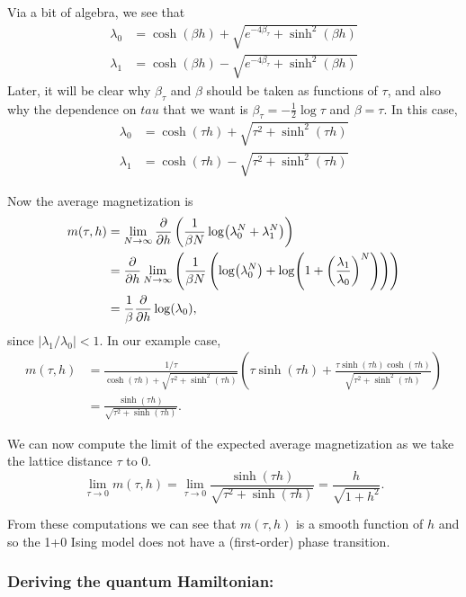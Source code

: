 \documentclass[10pt,reqno]{amsart}
\begin{document}
	Via a bit of algebra, we see that 
	\begin{align*}
		\lambda_0 &=\cosh(\beta h)+ \sqrt{e^{-4\beta_\tau} +\sinh^2(\beta h) } \\
		\lambda_1 &=\cosh(\beta h)- \sqrt{e^{-4\beta_\tau} +\sinh^2(\beta h) }
	\end{align*} 
	Later, it will be clear why $\beta_\tau$ and $\beta$ should be taken as functions of $\tau$, and
	also why the dependence on $tau$ that we want is $\beta_\tau=-\frac{1}{2}\log \tau$ and $\beta = \tau$.
	In this case,
	\begin{align*}
		\lambda_0 &=\cosh(\tau h)+ \sqrt{\tau^2 +\sinh^2(\tau h)} \\
		\lambda_1 &=\cosh(\tau h)- \sqrt{\tau^2 +\sinh^2(\tau h)}
	\end{align*}
	
	Now the average magnetization is
	\begin{align*}
		m(\tau, h)&=\lim_{N\to \infty}\frac{\partial}{\partial h}\left( \frac{1}{\beta N}\log(\lambda_0^N+\lambda_1^N) \right) \\
			&=\frac{\partial}{\partial h}\lim_{N\to \infty}\left( \frac{1}{\beta N}\left(\log(\lambda_0^N)+\log(1+\left(\frac{\lambda_1}{\lambda_0}\right)^N)\right) \right) \\
			&= \frac{1}{\beta}\frac{\partial}{\partial h} \log(\lambda_0),
	\end{align*}
	since $|\lambda_1/\lambda_0| <1.$
	In our example case,
	\begin{align*}
		m(\tau,h)&= \frac{1/\tau}{\cosh(\tau h)+ \sqrt{\tau^2 +\sinh^2(\tau h)}}\left( \tau \sinh(\tau h)+\frac{\tau \sinh(\tau h)\cosh(\tau h)}{\sqrt{\tau^2 +\sinh^2(\tau h)}} \right)\\
		&=\frac{\sinh(\tau h)}{\sqrt{\tau^2+\sinh(\tau h)}}.
	\end{align*}

	We can now compute the limit of the expected average magnetization as we take the lattice distance $\tau$ to 0.
		\[ \lim_{\tau \to 0} m(\tau,h) = \lim_{\tau \to 0} \frac{\sinh(\tau h)}{\sqrt{\tau^2+\sinh(\tau h)}} = \frac{h}{\sqrt{1+h^2}}. \]
		
	From these computations we can see that $m(\tau,h)$ is a smooth function of $h$ and so the 1+0 Ising model does not have a (first-order) phase transition.
	
	\subsubsection{Deriving the quantum Hamiltonian:}
	
\end{document}
